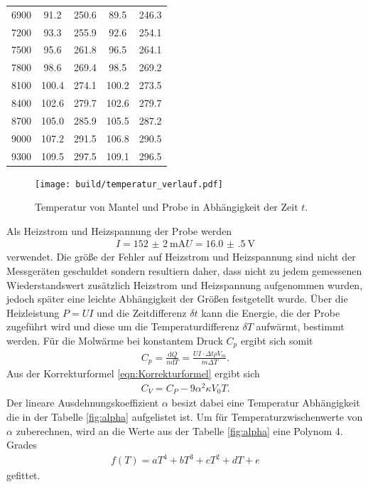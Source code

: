 \begin{table}
\begin{tabular}{c c c c c}
  6900	&	91.2	&	250.6	&	89.5	&	246.3   \\
  7200	&	93.3	&	255.9	&	92.6	&	254.1   \\
  7500	&	95.6	&	261.8	&	96.5	&	264.1   \\
  7800	&	98.6	&	269.4	&	98.5	&	269.2   \\
  8100	&	100.4	&	274.1	&	100.2	&	273.5   \\
  8400	&	102.6	&	279.7	&	102.6	&	279.7   \\
  8700	&	105.0	&	285.9	&	105.5	&	287.2   \\
  9000	&	107.2	&	291.5	&	106.8	&	290.5   \\
  9300	&	109.5	&	297.5	&	109.1	&	296.5   \\
\end{tabular}
\end{table}

\begin{figure}
  \centering
  \texttt{[image: build/temperatur\_verlauf.pdf]}
  \caption{Temperatur von Mantel und Probe in Abhängigkeit der Zeit $t$.}
  \label{fig:T_mess}
\end{figure}


Als Heizstrom und Heizspannung der Probe
werden
\begin{align}
  I = \SI{152(2)}{\milli\ampere}
  U = \SI{16.0(5)}{\volt}
\end{align}
verwendet. Die größe
der Fehler auf Heizstrom und Heizspannung
sind nicht der Messgeräten geschuldet
sondern resultiern daher, dass nicht
zu jedem gemessenen Wiederstandswert
zusätzlich Heizstrom und Heizspannung
aufgenommen wurden, jedoch später
eine leichte Abhängigkeit
der Größen festgetellt wurde.
Über die Heizleistung $P=UI$
und die Zeitdifferenz $\delta t$
kann die Energie, die der Probe zugeführt wird
und diese um die Temperaturdifferenz
$\delta T$ aufwärmt, bestimmt werden.
Für die Molwärme bei konstantem
Druck $C_p$ ergibt sich somit
\begin{align}
  C_p =\frac{\text{d} Q}{n \text{d} T }  = \frac{UI \cdot \Delta t \rho V_m }{m \Delta T}. \label{eqn:C_p}
\end{align}
Aus der Korrekturformel \eqref{eqn:Korrekturformel} ergibt sich
\begin{align}
C_V = C_P- 9\alpha^2 \kappa V_0 T \label{eqn:C_V}.
\end{align}
Der lineare Ausdehnungskoeffizient $\alpha$ besizt dabei
eine Temperatur Abhängigkeit die in der Tabelle \ref{fig:alpha}
aufgelistet ist. Um für Temperaturzwischenwerte von $\alpha$
zuberechnen, wird an die Werte aus der Tabelle \ref{fig:alpha}
eine Polynom 4. Grades
\begin{align}
f(T) = a T^4 + b  T^3 + c  T^2 + d T + e
\end{align}
gefittet.


